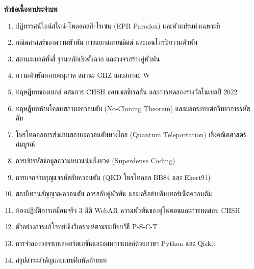 \begin{lessonplanbox}
\noindent\textbf{หัวข้อเนื้อหาประจำบท}
\begin{enumerate}
    \item ปฏิทรรศน์ไอน์สไตน์-โพดอลสกี-โรเซน (EPR Paradox) และตัวแปรแฝงเฉพาะที่
    \item คณิตศาสตร์ของความพัวพัน การแยกสลายชมิดต์ และเอนโทรปีความพัวพัน
    \item สถานะเบลล์ทั้งสี่ ฐานหลักเชิงตั้งฉาก และวงจรสร้างคู่พัวพัน
    \item ความพัวพันหลายอนุภาค สถานะ GHZ และสถานะ W
    \item ทฤษฎีบทของเบลล์ อสมการ CHSH ขอบเขตซิเรลสัน และการทดลองรางวัลโนเบลปี 2022
    \item ทฤษฎีบทห้ามโคลนสถานะควอนตัม (No-Cloning Theorem) และผลกระทบต่อวิทยาการรหัสลับ
    \item โพรโทคอลการส่งผ่านสถานะควอนตัมทางไกล (Quantum Teleportation) เชิงคณิตศาสตร์สมบูรณ์
    \item การเข้ารหัสข้อมูลความหนาแน่นยิ่งยวด (Superdense Coding)
    \item การแจกจ่ายกุญแจรหัสลับควอนตัม (QKD โพรโทคอล BB84 และ Ekert91)
    \item สถานีทวนสัญญาณควอนตัม การสลับคู่พัวพัน และเครือข่ายอินเทอร์เน็ตควอนตัม
    \item ห้องปฏิบัติการเสมือนจริง 3 มิติ WebAR ความพัวพันของคู่โฟตอนและการทดสอบ CHSH
    \item ตัวอย่างการแก้โจทย์เชิงวิเคราะห์ตามระเบียบวิธี P-S-C-T
    \item การจำลองวงจรเทเลพอร์ตเทชันและอสมการเบลล์ด้วยภาษา Python และ Qiskit
    \item สรุปสาระสำคัญและแบบฝึกหัดท้ายบท
\end{enumerate}


\end{lessonplanbox}
